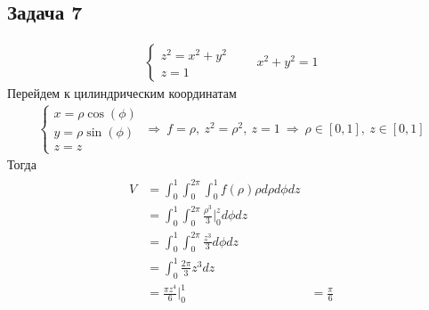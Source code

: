 \vskip 0.4in
\begin{comment}
Найдем точки пересечения
\begin{gather*}
z = xy \text{ и } z = 0\\
xy = 0\ \Rightarrow\ x = 0 \text{ или } y = 0\\
\\
x + y + z = 1 \text{ и } z = 0\\
x + y = 1\ \Rightarrow\ x \geqslant 0\quad y \leqslant 1\\
\\
z = xy \text{ и } x + y + z = 1\\
1-x-y = xy\ \Rightarrow\ y = \frac{1-x}{1+x}\quad z = x \cdot \frac{1-x}{1+x}
\end{gather*}
Тогда
\begin{gather*}
V = \int_{0}^{1} \int_{0}^{1} \int_{0}^{x \cdot \frac{1-x}{1+x}} dzdxdy =
\int_{0}^{1} \int_{0}^{1} 2-x+\frac{2}{1+x} dxdy =\\
\int_{0}^{1} 2x - \frac{1}{2} x^2 + 2\ln(x + 1) \bigg|_{0}^{1} dy=
\int_{0}^{1} \frac{3}{2} + 2\ln(2) dy = \frac{3}{2} + 2 \ln(2)
\end{gather*}
\end{comment}

\subsection*{Задача 7}
	\begin{gather*}
	\begin{cases}
		z^2 = x^2 + y^2\\
		z = 1
	\end{cases}\qquad
	x^2 + y^2 = 1
	\end{gather*}
	Перейдем к цилиндрическим координатам
	\begin{gather*}
	\begin{cases}
		x = \rho \cos(\phi)\\
		y = \rho \sin(\phi)\\
		z = z
	\end{cases}
	\ \Rightarrow\ 
	f = \rho,\ z^2 = \rho^2,\ z=1
	\ \Rightarrow\ 
	\rho \in [0,1],\ z \in [0,1]
	\end{gather*}
	Тогда
	\begin{gather*}
	\begin{aligned}
		V & = \int_{0}^{1} \int_{0}^{2\pi} \int_{0}^{1} f(\rho) \rho d \rho d \phi dz\\
		& = \int_{0}^{1} \int_{0}^{2\pi} \frac{\rho^3}{3} \bigg|_{0}^{z} d \phi dz\\
		& = \int_{0}^{1} \int_{0}^{2\pi} \frac{z^3}{3} d \phi dz\\
		& = \int_{0}^{1} \frac{2\pi}{3} z^3 dz\\
		& = \frac{\pi z^4}{6} \bigg|_{0}^{1}
		& = \frac{\pi}{6}
	\end{aligned}
	\end{gather*}
\vskip 0.4in


